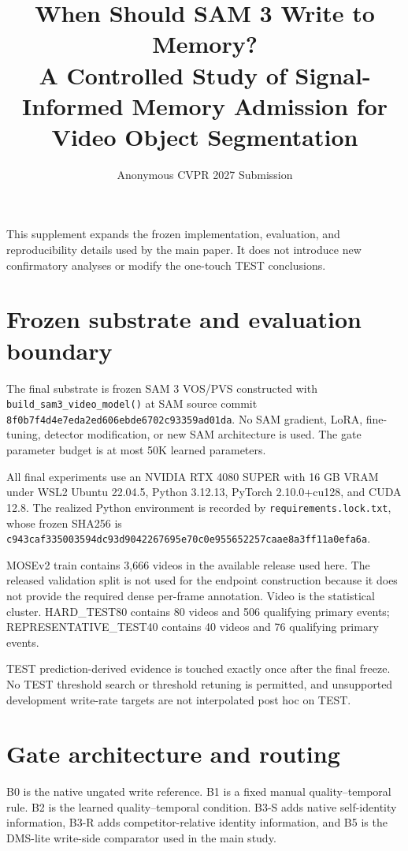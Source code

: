 \documentclass[10pt,twocolumn,letterpaper]{article}
\title{When Should SAM 3 Write to Memory?\\
A Controlled Study of Signal-Informed Memory Admission for
Video Object Segmentation}
\author{Anonymous CVPR 2027 Submission}
\begin{document}
\maketitlesupplementary

This supplement expands the frozen implementation, evaluation, and
reproducibility details used by the main paper.  It does not introduce new
confirmatory analyses or modify the one-touch TEST conclusions.

\section{Frozen substrate and evaluation boundary}
\label{sec:supp-substrate}

The final substrate is frozen SAM 3 VOS/PVS constructed with
\texttt{build\_sam3\_video\_model()} at SAM source commit
\texttt{8f0b7f4d4e7eda2ed606ebde6702c93359ad01da}.
No SAM gradient, LoRA, fine-tuning, detector modification, or new SAM
architecture is used.  The gate parameter budget is at most 50K learned
parameters.

All final experiments use an NVIDIA RTX 4080 SUPER with 16 GB VRAM under
WSL2 Ubuntu 22.04.5, Python 3.12.13, PyTorch 2.10.0+cu128, and CUDA 12.8.
The realized Python environment is recorded by
\texttt{requirements.lock.txt}, whose frozen SHA256 is
\texttt{c943caf335003594\allowbreak{}dc93d9042267695e\allowbreak{}70c0e955652257ca\allowbreak{}ae8a3ff11a0efa6a}.

MOSEv2 train contains 3,666 videos in the available release used here.
The released validation split is not used for the endpoint construction
because it does not provide the required dense per-frame annotation.
Video is the statistical cluster.  HARD\_TEST80 contains 80 videos and
506 qualifying primary events; REPRESENTATIVE\_TEST40 contains 40 videos
and 76 qualifying primary events.

TEST prediction-derived evidence is touched exactly once after the final
freeze.  No TEST threshold search or threshold retuning is permitted, and
unsupported development write-rate targets are not interpolated post hoc on
TEST.

\section{Gate architecture and routing}
\label{sec:supp-gates}

B0 is the native ungated write reference.  B1 is a fixed manual
quality--temporal rule.  B2 is the learned quality--temporal condition.
B3-S adds native self-identity information, B3-R adds competitor-relative
identity information, and B5 is the DMS-lite write-side comparator used in
the main study.
\end{document}
